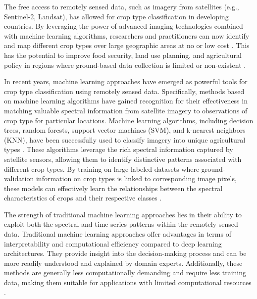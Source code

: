 \documentclass[
  journal,
  twocolumn]{IEEEtran}
\begin{document}
The free access to remotely sensed data, such as imagery from satellites
(e.g., Sentinel-2, Landsat), has allowed for crop type classification in
developing countries. By leveraging the power of advanced imaging
technologies combined with machine learning algorithms, researchers and
practitioners can now identify and map different crop types over large
geographic areas at no or low cost \citep{hersh2021open}. This has the
potential to improve food security, land use planning, and agricultural
policy in regions where ground-based data collection is limited or
non-existent
\citep{begue2018remote, li2023development, ibrahim2021mapping}.

In recent years, machine learning approaches have emerged as powerful
tools for crop type classification using remotely sensed data.
Specifically, methods based on machine learning algorithms have gained
recognition for their effectiveness in matching valuable spectral
information from satellite imagery to observations of crop type for
particular locations. Machine learning algorithms, including decision
trees, random forests, support vector machines (SVM), and k-nearest
neighbors (KNN), have been successfully used to classify imagery into
unique agricultural types
\citep{ibrahim2021mapping, begue2018remote, delince2017handbook}. These
algorithms leverage the rich spectral information captured by satellite
sensors, allowing them to identify distinctive patterns associated with
different crop types. By training on large labeled datasets where
ground-validation information on crop types is linked to corresponding
image pixels, these models can effectively learn the relationships
between the spectral characteristics of crops and their respective
classes \citep{begue2018remote}.

The strength of traditional machine learning approaches lies in their
ability to exploit both the spectral and time-series patterns within the
remotely sensed data. Traditional machine learning approaches offer
advantages in terms of interpretability and computational efficiency
compared to deep learning architectures. They provide insight into the
decision-making process and can be more readily understood and explained
by domain experts. Additionally, these methods are generally less
computationally demanding and require less training data, making them
suitable for applications with limited computational resources
\citep{hohl2024recent, rs13132591, agriculture13050965, LI2023103345, MA2019166}.
\end{document}
